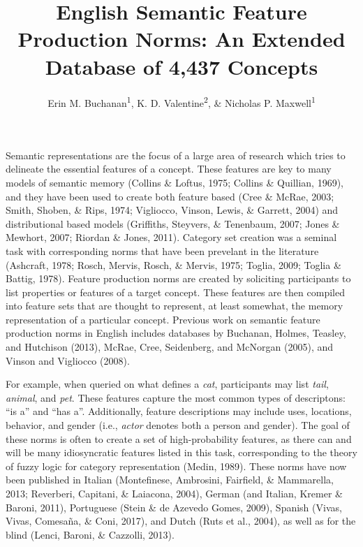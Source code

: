\documentclass[english,man]{apa6}
\title{English Semantic Feature Production Norms: An Extended Database of 4,437
Concepts}
\author{Erin M. Buchanan\textsuperscript{1}, K. D. Valentine\textsuperscript{2}, \& Nicholas P. Maxwell\textsuperscript{1}}
\affiliation{
    \vspace{0.5cm}
          \textsuperscript{1} Missouri State University\\
          \textsuperscript{2} University of Missouri  }
\theoremstyle{definition}
\theoremstyle{definition}
\theoremstyle{definition}
\theoremstyle{remark}
\begin{document}
\maketitle

\setcounter{secnumdepth}{0}



Semantic representations are the focus of a large area of research which
tries to delineate the essential features of a concept. These features
are key to many models of semantic memory (Collins \& Loftus, 1975;
Collins \& Quillian, 1969), and they have been used to create both
feature based (Cree \& McRae, 2003; Smith, Shoben, \& Rips, 1974;
Vigliocco, Vinson, Lewis, \& Garrett, 2004) and distributional based
models (Griffiths, Steyvers, \& Tenenbaum, 2007; Jones \& Mewhort, 2007;
Riordan \& Jones, 2011). Category set creation was a seminal task with
corresponding norms that have been prevelant in the literature
(Ashcraft, 1978; Rosch, Mervis, Rosch, \& Mervis, 1975; Toglia, 2009;
Toglia \& Battig, 1978). Feature production norms are created by
soliciting participants to list properties or features of a target
concept. These features are then compiled into feature sets that are
thought to represent, at least somewhat, the memory representation of a
particular concept. Previous work on semantic feature production norms
in English includes databases by Buchanan, Holmes, Teasley, and
Hutchison (2013), McRae, Cree, Seidenberg, and McNorgan (2005), and
Vinson and Vigliocco (2008).

For example, when queried on what defines a \emph{cat}, participants may
list \emph{tail}, \emph{animal}, and \emph{pet}. These features capture
the most common types of descriptons: \enquote{is a} and \enquote{has
a}. Additionally, feature descriptions may include uses, locations,
behavior, and gender (i.e., \emph{actor} denotes both a person and
gender). The goal of these norms is often to create a set of
high-probability features, as there can and will be many idiosyncratic
features listed in this task, corresponding to the theory of fuzzy logic
for category representation (Medin, 1989). These norms have now been
published in Italian (Montefinese, Ambrosini, Fairfield, \& Mammarella,
2013; Reverberi, Capitani, \& Laiacona, 2004), German (and Italian,
Kremer \& Baroni, 2011), Portuguese (Stein \& de Azevedo Gomes, 2009),
Spanish (Vivas, Vivas, Comesaña, \& Coni, 2017), and Dutch (Ruts et al.,
2004), as well as for the blind (Lenci, Baroni, \& Cazzolli, 2013).
\end{document}
